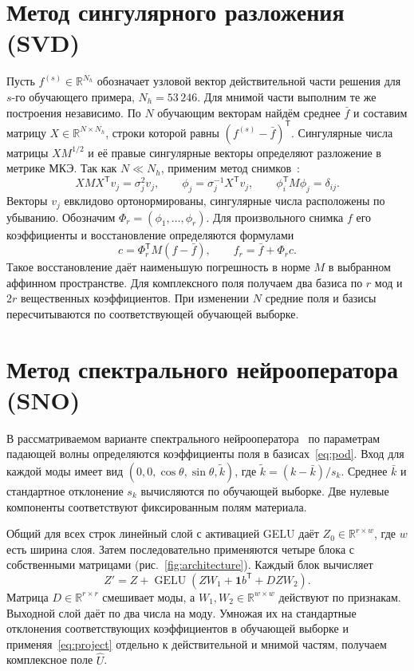 \documentclass[11pt,a4paper]{article}
\newcommand{\R}{\mathbb R}
\newcommand{\T}{\mathsf T}
\begin{document}
\clearpage
\section{Метод сингулярного разложения (SVD)}
Пусть $f^{(s)}\in\R^{N_h}$ обозначает узловой вектор действительной части решения для $s$-го обучающего примера, $N_h=53\,246$. Для мнимой части выполним те же построения независимо. По $N$ обучающим векторам найдём среднее $\bar f$ и составим матрицу $X\in\R^{N\times N_h}$, строки которой равны $(f^{(s)}-\bar f)^\T$. Сингулярные числа матрицы $XM^{1/2}$ и её правые сингулярные векторы определяют разложение в метрике МКЭ. Так как $N\ll N_h$, применим метод снимков~\cite{sirovich}:
\begin{equation}
  XMX^\T v_j=\sigma_j^2 v_j,\qquad
  \phi_j=\sigma_j^{-1}X^\T v_j,\qquad
  \phi_i^\T M\phi_j=\delta_{ij}.
  \label{eq:pod}
\end{equation}
Векторы $v_j$ евклидово ортонормированы, сингулярные числа расположены по убыванию. Обозначим $\Phi_r=(\phi_1,\ldots,\phi_r)$. Для произвольного снимка $f$ его коэффициенты и восстановление определяются формулами
\begin{equation}
 c=\Phi_r^\T M(f-\bar f),\qquad f_r=\bar f+\Phi_r c .
 \label{eq:project}
\end{equation}
Такое восстановление даёт наименьшую погрешность в норме $M$ в выбранном аффинном пространстве. Для комплексного поля получаем два базиса по $r$ мод и $2r$ вещественных коэффициентов. При изменении $N$ средние поля и базисы пересчитываются по соответствующей обучающей выборке.

\section{Метод спектрального нейрооператора (SNO)}
В рассматриваемом варианте спектрального нейрооператора~\cite{fanaskov} по параметрам падающей волны определяются коэффициенты поля в базисах~\eqref{eq:pod}. Вход для каждой моды имеет вид $(0,0,\cos\theta,\sin\theta,\widetilde k)$, где $\widetilde k=(k-\bar k)/s_k$. Среднее $\bar k$ и стандартное отклонение $s_k$ вычисляются по обучающей выборке. Две нулевые компоненты соответствуют фиксированным полям материала.

Общий для всех строк линейный слой с активацией GELU даёт $Z_0\in\R^{r\times w}$, где $w$ есть ширина слоя. Затем последовательно применяются четыре блока с собственными матрицами (рис.~\ref{fig:architecture}). Каждый блок вычисляет
\begin{equation}
 Z' = Z+\operatorname{GELU}\!\left(ZW_1+\mathbf1 b^\T+DZW_2\right).
 \label{eq:block}
\end{equation}
Матрица $D\in\R^{r\times r}$ смешивает моды, а $W_1,W_2\in\R^{w\times w}$ действуют по признакам. Выходной слой даёт по два числа на моду. Умножая их на стандартные отклонения соответствующих коэффициентов в обучающей выборке и применяя~\eqref{eq:project} отдельно к действительной и мнимой частям, получаем комплексное поле $\widehat U$.
\end{document}
